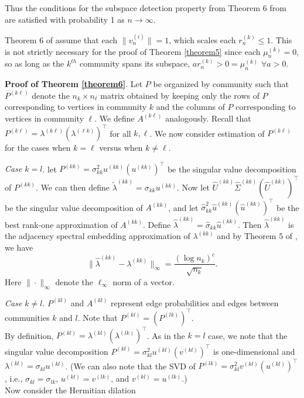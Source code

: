 \documentclass[12pt]{article}
\begin{document}
Thus the conditions for the subspace detection property from Theorem 6
from \citeauthor{jmlr-v28-wang13} are satisfied with probability 1 as
\(n \to \infty\).

\begin{remark}
Theorem 6 of \citeauthor{jmlr-v28-wang13} assume that each $\|v_n^{(i)}\| = 1$, 
which scales each $r_n^{(k)} \leq 1$. This is not strictly necessary for 
the proof of Theorem \ref{theorem5} since each $\mu_n^{(k)} = 0$, so as long 
as the $k^{th}$ community spans its subspace, $a r_n^{(k)} > 0 = \mu_n^{(k)}$ 
$\forall a > 0$.
\end{remark}

\textbf{Proof of Theorem \ref{theorem6}}. Let \(P\) be
organized by community such that \(P^{(k \ell)}\) denote the $n_k \times
n_{\ell}$ matrix obtained by keeping only the rows of $P$
corresponding to vertices in community $k$ and the columns of $P$
corresponding to vertices in community $\ell$. We define $A^{(k
  \ell)}$ analogously. Recall that $P^{(k \ell)} = \lambda^{(k \ell)} (\lambda^{(\ell k)})^{\top}$ for all $k, \ell$. We now consider estimation of $P^{(k \ell)}$
for the cases when $k = \ell$ versus when $k \not = \ell$.

\emph{Case \(k = l\)}. let $P^{(kk)} =
\sigma_{kk}^2 u^{(kk)} (u^{(kk)})^\top$ be the singular value
decomposition of $P^{(kk)}$. We can then define
$\tilde{\lambda}^{(kk)} = \sigma_{kk} u^{(kk)}$. 
Now let $\hat{U}^{(kk)} \hat{\Sigma}^{(kk)} (\hat{U}^{(kk)})^\top$ be the
singular value decomposition of \(A^{(kk)}\), and let
$\hat{\sigma}_{kk}^2 \hat{u}^{(kk)} (\hat{u}^{(kk)})^\top$ be the
best rank-one approximation of $A^{(kk)}$. Define
\(\hat{\lambda}^{(kk)} = \hat{\sigma}_{kk} \hat{u}^{(kk)}\). Then
\(\hat{\lambda}^{(kk)}\) is the adjacency spectral embedding approximation of \(\lambda^{(kk)}\)
and by Theorem 5 of \citeauthor{rubindelanchy2017statistical}, we have
$$\|\hat{\lambda}^{(kk)} - \lambda^{(kk)}\|_{\infty} = \frac{(\log n_k)^c}{\sqrt{n_k}}.$$
Here $\|\cdot\|_{\infty}$ denote the $\ell_{\infty}$ norm of a vector.

\emph{Case \(k \neq l\)}. \(P^{(kl)}\) and \(A^{(kl)}\) represent edge
probabilities and edges between communities \(k\) and \(l\). Note that
\(P^{(kl)} = (P^{(lk)})^\top\).\\
By definition, \(P^{(kl)} = \lambda^{(kl)} (\lambda^{(lk)})^\top\). As
in the \(k = l\) case, we note that the singular value decomposition
\(P^{(kl)} = \sigma_{kl}^2 u^{(kl)} (v^{(kl)})^\top\) is one-dimensional
and \(\lambda^{(kl)} = \sigma_{kl} u^{(kl)}\). (We can also note that
the SVD of \(P^{(lk)} = \sigma_{kl}^2 v^{(kl)} (u^{(kl)})^\top\), i.e.,
\(\sigma_{kl} = \sigma_{lk}\), \(u^{(kl)} = v^{(lk)}\), and
\(v^{(kl)} = u^{(lk)}\).)\\
Now consider the Hermitian dilation
\end{document}
